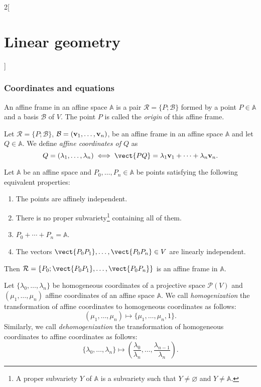 \documentclass[../../../main.tex]{subfiles}
\begin{document}
\begin{multicols}{2}[\section{Linear geometry}]
    \subsubsection{Coordinates and equations}
    \begin{definition}
        An affine frame in an affine space $\mathbb{A}$ is a pair $\mathcal{R}=\{P;\mathcal{B}\}$ formed by a point $P\in\mathbb{A}$ and a basis $\mathcal{B}$ of $V$. The point $P$ is called the \textit{origin} of this affine frame.
    \end{definition}
    \begin{definition}
        Let $\mathcal{R}=\{P;\mathcal{B}\}$, $\mathcal{B}=(\boldsymbol{\mathrm{v}}_1,\ldots,\boldsymbol{\mathrm{v}}_n)$, be an affine frame in an affine space $\mathbb{A}$ and let $Q\in\mathbb{A}$. We define \textit{affine coordinates of $Q$} as $$Q=(\lambda_1,\ldots,\lambda_n)\iff\vect{PQ}=\lambda_1\vf{v}_1+\cdots+\lambda_n\vf{v}_n.$$
    \end{definition}
    \begin{prop}
        Let $\mathbb{A}$ be an affine space and $P_0,\ldots,P_n\in\mathbb{A}$ be points satisfying the following equivalent properties:
        \begin{enumerate}
            \item The points are affinely independent.
            \item There is no proper subvariety\footnote{A proper subvariety $Y$ of $\mathbb{A}$ is a subvariety such that $Y\ne\varnothing$ and  $Y\ne\mathbb{A}$.} containing all of them.
            \item $P_0+\cdots+P_n=\mathbb{A}$.
            \item The vectors $\vect{P_0P_1},\ldots,\vect{P_0P_n}\in V$ are linearly independent.
        \end{enumerate}
        Then $\mathcal{R}=\{P_0;\vect{P_0P_1},\ldots,\vect{P_0P_n}\}$ is an affine frame in $\mathbb{A}$.
    \end{prop}
    \begin{definition}
        Let $\{\lambda_0,\ldots,\lambda_n\}$ be homogeneous coordinates of a projective space $\mathcal{P}(V)$ and $(\mu_1,\ldots,\mu_n)$ affine coordinates of an affine space $\mathbb{A}$. We call \textit{homogenization} the transformation of affine coordinates to homogeneous coordinates as follows: $$(\mu_1,\ldots,\mu_n)\longmapsto\{\mu_1,\ldots,\mu_n,1\}.$$ Similarly, we call \textit{dehomogenization} the transformation of homogeneous coordinates to affine coordinates as follows: $$\{\lambda_0,\ldots,\lambda_n\}\longmapsto\left(\frac{\lambda_0}{\lambda_n},\ldots,\frac{\lambda_{n-1}}{\lambda_n}\right).$$

\end{definition}
\end{multicols}
\end{document}
